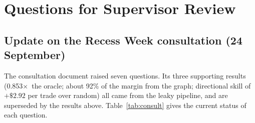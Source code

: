 \documentclass[11pt,a4paper]{article}
\newcommand{\x}{\ensuremath{\times}}
\begin{document}
\section{Questions for Supervisor Review}\label{sec:questions}

\subsection{Update on the Recess Week consultation (24 September)}
The consultation document raised seven questions. Its three supporting results
(0.853\x\ the oracle; about 92\% of the margin from the graph; directional skill
of $+\$2.92$ per trade over random) all came from the leaky pipeline, and are
superseded by the results above. Table~\ref{tab:consult} gives the current
status of each question.
\end{document}

